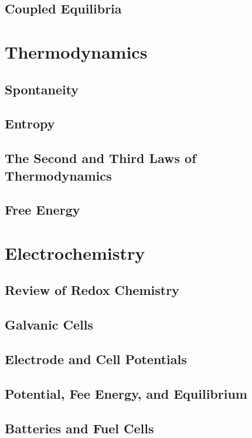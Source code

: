 \documentclass[12pt, openany, letterpaper]{memoir}
\begin{document}
\section{Coupled Equilibria}

\chapter{Thermodynamics}

\section{Spontaneity}

\section{Entropy}

\section{The Second and Third Laws of Thermodynamics}

\section{Free Energy}

\chapter{Electrochemistry}

\section{Review of Redox Chemistry}

\section{Galvanic Cells}

\section{Electrode and Cell Potentials}

\section{Potential, Fee Energy, and Equilibrium}

\section{Batteries and Fuel Cells}
\end{document}
